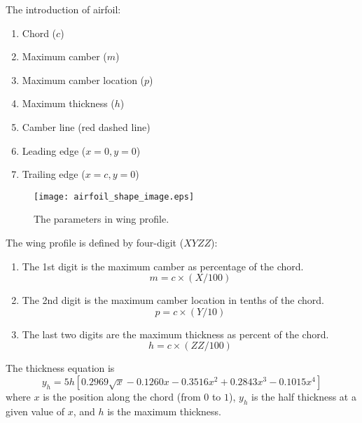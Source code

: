 \documentclass{turgon}
\begin{document}
\begin{flushleft}

The introduction of airfoil:
\begin{enumerate}
    \item
    Chord ($c$)
    \item
    Maximum camber ($m$)
    \item
    Maximum camber location ($p$)
    \item
    Maximum thickness ($h$)
    \item
    Camber line (red dashed line)
    \item
    Leading edge ($x = 0, y = 0$)
    \item
    Trailing edge ($x = c, y = 0$)
\end{enumerate}
\begin{figure}[h]
    \centering
    \texttt{[image: airfoil\_shape\_image.eps]}
    \caption{The parameters in wing profile.}
    \label{fig:airfoil_shape_image}
\end{figure}

\bigbreak
The wing profile is defined by four-digit ($XYZZ$):
\begin{enumerate}
    \item
    The 1st digit is the maximum camber as percentage of the chord.
    \begin{equation}
        m = c \times (X/100)
    \end{equation}
    \item
    The 2nd digit is the maximum camber location in tenths of the chord.
    \begin{equation}
        p = c \times (Y/10)
    \end{equation}
    \item
    The last two digits are the maximum thickness as percent of the chord.
    \begin{equation}
        h = c \times (ZZ/100)
    \end{equation}
\end{enumerate}

\bigbreak
The thickness equation is
\begin{equation}
    y_h = 5h[0.2969\sqrt{x}-0.1260x-0.3516x^2+0.2843x^3-0.1015x^4]
\end{equation}
where $x$ is the position along the chord (from $0$ to $1$), $y_h$ is the
half thickness at a given value of $x$, and $h$ is the maximum thickness.


\end{flushleft}
\end{document}
